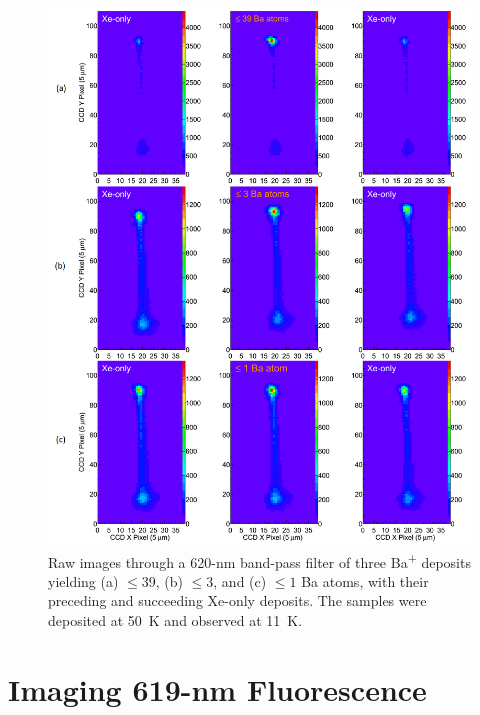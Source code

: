 


\begin{figure} %
        \centering
                \includegraphics[width=.95\textwidth]{figures/xebaxe_instantaneous_scrunched.png}
                \caption{Raw images through a 620-nm band-pass filter of three Ba\textsuperscript{+} deposits yielding (a) $\leq 39$, (b) $\leq 3$, and (c) $\leq 1$ Ba atoms, with their preceding and succeeding Xe-only deposits.  The samples were deposited at 50~K and observed at 11~K.}
\label{fig:xebaxe}
\end{figure}

\section{Imaging 619-nm Fluorescence}
\label{sec:imaging619}

